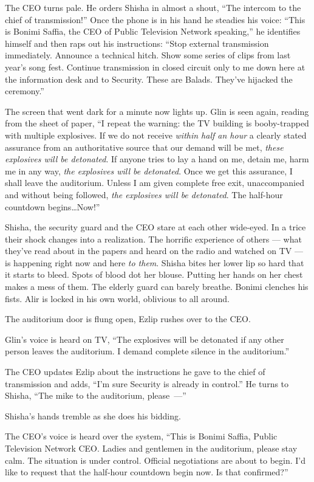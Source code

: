 \documentclass[twoside,11pt,openany]{book}
\begin{document}
The CEO turns pale. He orders Shisha in almost a shout, ``The intercom to the
chief of transmission!'' Once the phone is in his hand he steadies his voice:
``This is Bonimi Saffia, the CEO of Public Television Network speaking,'' he identifies
himself and then raps out his instructions: ``Stop external transmission immediately. Announce a technical
hitch. Show some series of clips from last year's song fest. Continue transmission in closed circuit only to me down
here at the information desk and to Security. These are Balads. They've hijacked the ceremony.''

The screen that went dark for a minute now lights up. Glin is seen again, reading from the sheet of paper,
``I repeat the warning: the TV building is booby-trapped with multiple explosives.  If we do not receive
\textit{within half an hour} a clearly stated assurance from an authoritative source that our demand will be met,
\textit{these explosives will be detonated}. If anyone tries to lay a hand on me, detain me, harm me in any way,
\textit{the explosives will be detonated}. Once we get this assurance, I shall leave the auditorium. Unless I am given
complete free exit, unaccompanied and without{ }being followed, \textit{the
explosives will be detonated}. The half-hour countdown begins{\ldots}Now!''

Shisha, the security guard and the CEO stare at each other wide-eyed. In a trice their shock changes into a
realization. The horrific experience of others ---  what they've read about in the papers and heard on the radio and
watched on TV  --- is happening right now and here \textit{to them}. Shisha bites her lower lip so hard that it
starts to bleed. Spots of blood dot her blouse. Putting her hands on her chest makes a mess of them. The elderly
guard can barely breathe. Bonimi clenches his fists. Alir is locked in his own world, oblivious to all around.

The auditorium door is flung open, Ezlip rushes over to the CEO.

Glin's voice is heard on TV, ``The explosives will be detonated if any other person leaves the auditorium.
I demand complete silence in the auditorium.''

The CEO updates Ezlip about the instructions he gave to the chief of transmission and adds, ``I'm sure
Security is already in control.'' He turns to Shisha, ``The mike to the auditorium, please~---''

Shisha's hands tremble as she does his bidding.

The CEO's voice is heard over the system, ``This is Bonimi Saffia, Public Television Network CEO. Ladies
and gentlemen in the auditorium, please stay calm. The situation is under control. Official negotiations are about
to begin. I'd like to request that the
half-hour countdown begin now. Is that confirmed?''
\end{document}
